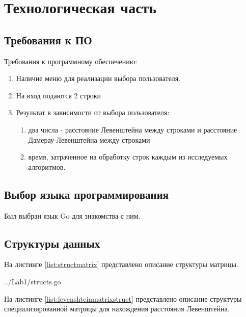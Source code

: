 
\chapter{Технологическая часть}\label{tecnology}

\section{Требования к ПО}\label{Requirements}

Требования к программному обеспечению:
\begin{enumerate}
    \item Наличие меню для реализации выбора пользователя.
    \item На вход подаются 2 строки
    \item Результат в зависимости от выбора пользователя:
    \begin{enumerate}
        \item два числа - расстояние Левенштейна между строками и расстояние Дамерау-Левенштейна между строками
        \item время, затраченное на обработку строк каждым из исследуемых алгоритмов.
    \end{enumerate}
\end{enumerate}

\section{Выбор языка программирования}\label{Requirements}

Был выбран язык Go для знакомства с ним.


\section{Структуры данных}\label{StructsList}

На листинге \ref{list:structmatrix} представлено описание структуры матрицы.

\begin{lstinputlisting}
    [caption = {Структура матрицы},
    label = {list:matrixstruct},
    linerange={8-12},
    ]{../Lab1/structs.go}
\end{lstinputlisting}\label{list:structmatrix}

На листинге \ref{list:levenshteinmatrixstruct} представлено описание структуры специализированной матрицы для нахождения расстояния Левенштейна.

